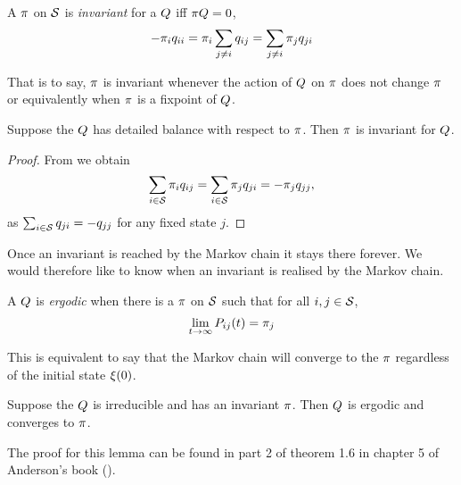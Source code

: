 \begin{definition}
  A \pmf $\pi$ on $\mathcal{S}$ is
  \emph{invariant} for a \qmatrix $Q$
  iff $\pi Q = 0$, \ie
  \[ -\pi_i q_{ii} = \pi_i \sum_{j \neq i} q_{ij}
                  = \sum_{j \neq i} \pi_j q_{ji} \]
\end{definition}

That is to say, $\pi$ is invariant
whenever the action of $Q$ on $\pi$ does not change $\pi$
or equivalently when $\pi$ is a fixpoint of $Q$.

\begin{lemma}
  Suppose the \qmatrix $Q$
  has detailed balance with respect to $\pi$.
  Then $\pi$ is invariant for $Q$.
\end{lemma}
\begin{proof}
  From  we obtain
  \[ \sum_{i \in \mathcal{S}} \pi_i q_{ij} =
     \sum_{i \in \mathcal{S}} \pi_j q_{ji} = -\pi_j q_{jj}, \]
  as $\sum_{i \in \mathcal{S}} q_{ji} = -q_{jj}$ for any fixed state $j$.
\end{proof}

Once an invariant \pmf is reached by the Markov chain
it stays there forever.
We would therefore like to know when an invariant
\pmf is realised by the Markov chain.

\begin{definition}[ergodicity]
  A \qmatrix $Q$ is \emph{ergodic} when
  there is a \pmf $\pi$ on $\mathcal{S}$ such that
  for all $i,j \in \mathcal{S}$,
  \[ \lim_{t \to \infty} P_{ij}(t) = \pi_j \]
\end{definition}

This is equivalent to say that the Markov chain
will converge to the \pmf $\pi$
regardless of the initial state $\xi(0)$.

\begin{lemma}
  Suppose the \qmatrix $Q$ is irreducible
  and has an invariant \pmf $\pi$.
  Then $Q$ is ergodic and converges to $\pi$.
\end{lemma}

The proof for this lemma can be found in part 2 of theorem 1.6
in chapter 5 of Anderson's book (\cite*[][pages 160--161]{anderson}).

